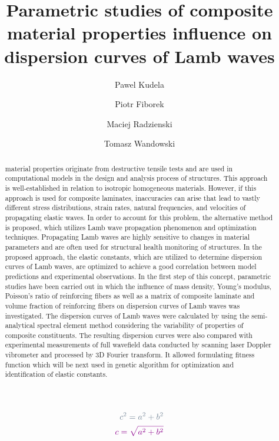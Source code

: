 \documentclass[]{spie}  %
\title{Parametric studies of composite material properties influence on dispersion curves of Lamb waves}
\author[a]{Pawel Kudela}
\author[a]{Piotr Fiborek}
\author[a]{Maciej Radzienski}
\author[a]{Tomasz Wandowski}
\affil[a]{Institute of Fluid-Flow Machinery, Polish Academy of Sciences, Fiszera 14 St, 80-231 Gdansk, Poland}
\begin{document}
 
\maketitle

\begin{abstract}
 material properties originate from destructive tensile tests and are used in computational models in the design and analysis process of structures. 
This approach is well-established in relation to isotropic homogeneous materials. 
However, if this approach is used for composite laminates, inaccuracies can arise that lead to vastly different stress distributions, strain rates, natural frequencies, and velocities of propagating elastic waves. 
In order to account for this problem, the alternative method is proposed, which utilizes Lamb wave propagation phenomenon and optimization techniques. 
Propagating Lamb waves are highly sensitive to changes in material parameters and are often used for structural health monitoring of structures.
In the proposed approach, the elastic constants, which are utilized to determine dispersion curves of Lamb waves, are optimized to achieve a good correlation between model predictions and experimental observations. 
In the first step of this concept, parametric studies have been carried out in which the influence of mass density, Young's modulus, Poisson's ratio of reinforcing fibers as well as a matrix of composite laminate and volume fraction of reinforcing fibers on dispersion curves of Lamb waves was investigated. 
The dispersion curves of Lamb waves were calculated by using the semi-analytical spectral element method considering the variability of properties of composite constituents. 
The resulting dispersion curves were also compared with experimental measurements of full wavefield data conducted by scanning laser Doppler vibrometer and processed by 3D Fourier transform. It allowed formulating fitness function which will be next used in genetic algorithm for optimization and identification of elastic constants.
\end{abstract}


\begin{equation}
\begin{aligned}
\begin{aligned}
\DIFdelmath{
c^2=a^2+b^2
}\\
\DIFaddmath{
c=\sqrt{a^2+b^2}
\label{eq:pitagoras}
}	
\end{aligned}
\end{aligned}
\end{equation}
\end{document}
